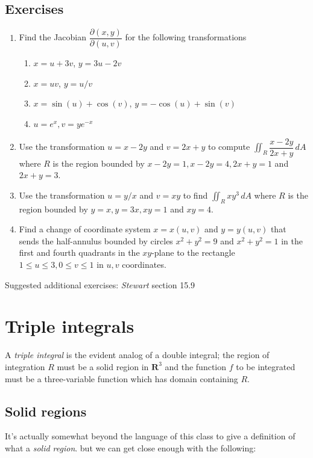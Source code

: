 \documentclass[12pt]{article}
\numberwithin{equation}{subsection}
\numberwithin{figure}{subsection}
\theoremstyle{note}
\begin{document}
{\subsection{Exercises}

\begin{enumerate}[label=\arabic*.]
\item Find the Jacobian $\dfrac{\partial(x,y)}{\partial(u,v)}$ for the following transformations

\begin{enumerate}
	\item $x=u+3v$, $y=3u-2v$
	\item $x=uv$, $y=u/v$
	\item $x=\sin(u)+\cos(v)$, $y=-\cos(u)+\sin(v)$
	\item $u=e^x, v=ye^{-x}$
\end{enumerate}

\item Use the transformation $u=x-2y$ and $v=2x+y$ to compute $\displaystyle \iint_R \dfrac{x-2y}{2x+y}\,dA$ where $R$ is the region bounded by $x-2y=1, x-2y=4, 2x+y=1$ and $2x+y=3$.

\item  Use the transformation $u=y/x$ and $v=xy$ to find $\displaystyle \iint_R xy^3\,dA$ where $R$ is the region bounded by $y=x, y=3x, xy=1$ and $xy=4$.

\item  Find a change of coordinate system $x=x(u,v)$ and $y=y(u,v)$ that sends the half-annulus bounded by circles $x^2+y^2=9$ and $x^2+y^2=1$ in the first and fourth quadrants in the $xy$-plane to the rectangle $1\leq u \leq 3, 0\leq v\leq 1$ in $u,v$ coordinates.
\end{enumerate}
Suggested additional exercises: \textit{Stewart} section 15.9

\section{Triple integrals}



A \textit{triple integral} is the evident analog of a double integral; the region of integration $R$ must be a solid region in $\mathbf{R}^3$ and the function $f$ to be integrated must be a three-variable function which has domain containing $R$. 

\subsection{Solid regions}
It's actually somewhat beyond the language of this class to give a definition of what a \textit{solid region}. but we can get close enough with the following: 

}
\end{document}
